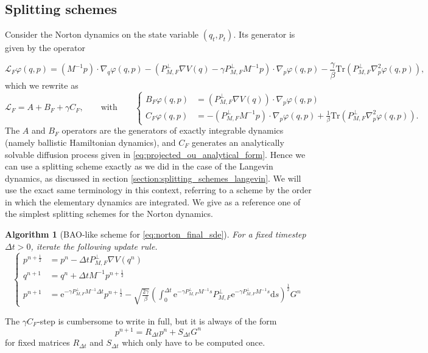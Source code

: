 \documentclass[a4paper,10pt,twoside,leqno]{report}
\newtheorem{algorithm}{Algorithm}
\newcommand{\cL}{\mathcal{L}}
\newcommand{\dif}{\mathrm{d}}
\newcommand{\1}{\mathbbm{1}}
\newcommand{\e}{\mathrm{e}}
\newcommand{\Dt}{{\Delta t}}
\begin{document}
    \subsection{Splitting schemes}
    Consider the Norton dynamics on the state variable $(q_t,p_t)$. Its generator is given by the operator
    
    \begin{equation}
        \label{eq:norton_generator}
        \cL_F\varphi(q,p)=(M^{-1}p)\cdot \nabla_q\varphi(q,p)-(P_{M,F}^\perp\nabla V(q)-\gamma P_{M,F}^\perp M^{-1}p)\cdot\nabla_p\varphi(q,p)-\frac{\gamma}\beta\mathrm{Tr}\left(P_{M,F}^\perp\nabla_p^2\varphi(q,p)\right),
    \end{equation}
    which we rewrite as 
    \begin{equation}
        \label{eq:norton_generator_splitting}
        \cL_F=A+B_F+\gamma C_F,\qquad \text{with} \qquad
        \left\{\begin{aligned}
            B_F\varphi(q,p)&=\left(P_{M,F}^\perp\nabla V(q)\right)\cdot \nabla_p\varphi(q,p)\\
            C_F\varphi(q,p)&=-\left(P_{M,F}^\perp M^{-1}p\right)\cdot\nabla_p\varphi(q,p)+\frac1\beta\mathrm{Tr}\left(P_{M,F}^\perp\nabla_p^2\varphi(q,p)\right).
        \end{aligned}\right.
    \end{equation}
    The $A$ and $B_F$ operators are the generators of exactly integrable dynamics (namely ballistic Hamiltonian dynamics), and $C_F$ generates an analytically solvable diffusion process given in \eqref{eq:projected_ou_analytical_form}. Hence we can use a splitting scheme exactly as we did in the case of the Langevin dynamics, as discussed in section \ref{section:splitting_schemes_langevin}. 
    We will use the exact same terminology in this context, referring to a scheme by the order in which the elementary dynamics are integrated.
    We give as a reference one of the simplest splitting schemes for the Norton dynamics.
    
    \begin{algorithm}[BAO-like scheme for \eqref{eq:norton_final_sde}]
        For a fixed timestep $\Dt>0$, iterate the following update rule.
        \begin{equation}
            \left\{
                \begin{aligned}
                    p^{n+\frac12}&=p^n-\Dt P_{M,F}^\perp \nabla V(q^n)\\
                    q^{n+1}&=q^n+\Dt M^{-1}p^{n+\frac12}\\
                    p^{n+1}&=\mathrm{e}^{-\gamma P_{M,F}^\perp M^{-1}\Dt}p^{n+\frac12}-\sqrt{\frac{2\gamma}{\beta}}\left(\int_0^\Dt\e^{-\gamma P_{M,F}^\perp M^{-1}s}P_{M,F}^\perp\e^{-\gamma P_{M,F}^\perp M^{-1}s} \dif s\right)^{\frac12}G^n
                \end{aligned}\right.
        \end{equation}
    \end{algorithm}
    The $\gamma C_F$-step is cumbersome to write in full, but it is always of the form 
    \[p^{n+1}=R_\Dt p^n + S_\Dt G^n\]
    for fixed matrices $R_\Dt$ and $S_\Dt$ which only have to be computed once.
    
\end{document}
